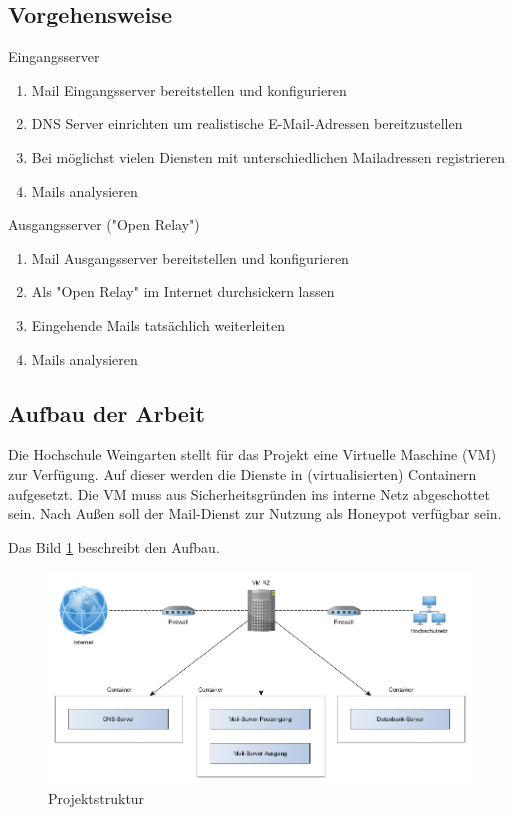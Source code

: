 \documentclass[a4paper,11pt,singlespacing]{article}
\begin{document}
	\subsection{Vorgehensweise}\label{sec:Vorgehensweise}
		Eingangsserver
		\begin{enumerate}
		\item Mail Eingangsserver bereitstellen und konfigurieren
		\item DNS Server einrichten um realistische E-Mail-Adressen bereitzustellen
		\item Bei möglichst vielen Diensten mit unterschiedlichen Mailadressen registrieren
		\item Mails analysieren
		\end{enumerate}

		Ausgangsserver ("Open Relay") %
		\begin{enumerate}
		\item Mail Ausgangsserver bereitstellen und konfigurieren
		\item Als "Open Relay" im Internet durchsickern lassen %
		\item Eingehende Mails tatsächlich weiterleiten
		\item Mails analysieren
		\end{enumerate}

	\subsection{Aufbau der Arbeit}\label{sec:Aufbau}
		Die Hochschule Weingarten stellt für das Projekt eine Virtuelle Maschine (VM) zur Verfügung. %
		Auf dieser werden die Dienste in (virtualisierten) Containern aufgesetzt. %
		Die VM muss aus Sicherheitsgründen ins interne Netz abgeschottet sein.
		Nach Außen soll der Mail-Dienst zur Nutzung als Honeypot verfügbar sein.

		Das Bild \ref{fig:structure} beschreibt den Aufbau.

		\begin{figure}
		\includegraphics[width=\linewidth]{2-Hierarchy.png}
		\caption{Projektstruktur}
		\label{fig:structure}
		\end{figure}
\end{document}
